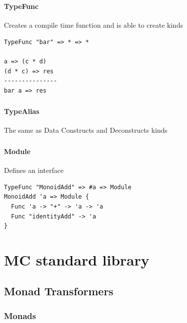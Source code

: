 \begin{frame}[fragile]
   \frametitle{\subsecname}
   \framesubtitle{TypeFunc}

   Creates a compile time function and is able to create kinds
   \begin{lstlisting}
TypeFunc "bar" => * => *

a => (c * d)
(d * c) => res
---------------
bar a => res
   \end{lstlisting}
\end{frame}

\begin{frame}[fragile]
   \frametitle{\subsecname}
   \framesubtitle{TypeAlias}

   The same as Data
   Constructs and Deconstructs kinds
\end{frame}

\begin{frame}[fragile]
   \frametitle{\subsecname}
   \framesubtitle{Module}

   Defines an interface
   \begin{lstlisting}
TypeFunc "MonoidAdd" => #a => Module
MonoidAdd 'a => Module {
  Func 'a -> "+" -> 'a -> 'a
  Func "identityAdd" -> 'a
}
   \end{lstlisting}
\end{frame}

\section{MC standard library}
\subsection{Monad Transformers}
\subsubsection{Monads}

